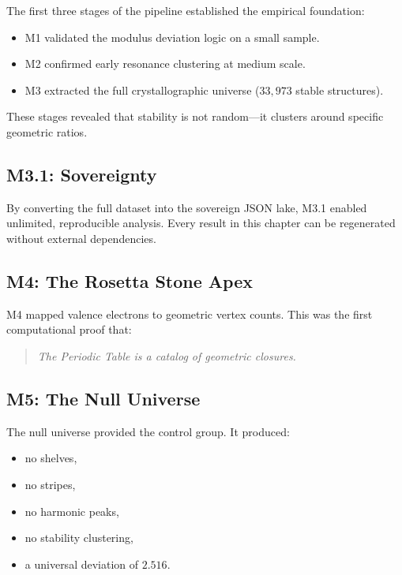 \documentclass[11pt, letterpaper, openany]{book}
\begin{document}
The first three stages of the pipeline established the empirical foundation:

\begin{itemize}
    \item M1 validated the modulus deviation logic on a small sample.
    \item M2 confirmed early resonance clustering at medium scale.
    \item M3 extracted the full crystallographic universe ($33{,}973$ stable structures).
\end{itemize}

These stages revealed that stability is not random—it clusters around specific geometric
ratios.

\subsection*{M3.1: Sovereignty}

By converting the full dataset into the sovereign JSON lake, M3.1 enabled unlimited,
reproducible analysis. Every result in this chapter can be regenerated without external
dependencies.

\subsection*{M4: The Rosetta Stone Apex}

M4 mapped valence electrons to geometric vertex counts. This was the first computational
proof that:

\begin{quote}
\textit{The Periodic Table is a catalog of geometric closures.}
\end{quote}

\subsection*{M5: The Null Universe}

The null universe provided the control group. It produced:

\begin{itemize}
    \item no shelves,
    \item no stripes,
    \item no harmonic peaks,
    \item no stability clustering,
    \item a universal deviation of $2.516$.
\end{itemize}
\end{document}
